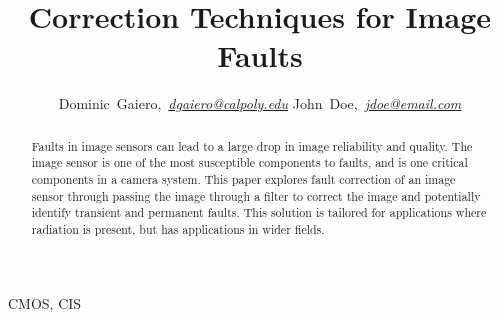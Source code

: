 \documentclass[journal]{IEEEtran}
\begin{document}
\title{Correction Techniques for Image Faults}


\author{Dominic~Gaiero,~\textit{\href{mailto:dgaiero@calpoly.edu}{dgaiero@calpoly.edu}}
        John~Doe,~\textit{\href{mailto:jdoe@email.com}{jdoe@email.com}}}

\maketitle
\begin{abstract}
Faults in image sensors can lead to a large drop in image reliability and quality.  The image sensor is one of the most susceptible components to faults, and is one critical components in a camera system.  This paper explores fault correction of an image sensor through passing the image through a filter to correct the image and potentially identify transient and permanent faults.  This solution is tailored for applications where radiation is present, but has applications in wider fields.  
\end{abstract}



\begin{IEEEkeywords}
CMOS, CIS
\end{IEEEkeywords}
\end{document}
